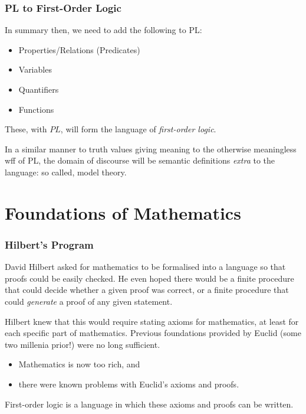 \documentclass{beamer}
\begin{document}
\begin{frame}
	\frametitle{PL to First-Order Logic}
	
	In summary then, we need to add the following to PL: 
	
	\begin{itemize}
		\item Properties/Relations (Predicates)
		\item Variables
		\item Quantifiers
		\item Functions
	\end{itemize}
	
	These, with $PL$, will form the language of \emph{first-order logic}. 
	
	\vspace{0.5cm} 
	
	In a similar manner to truth values giving meaning to the otherwise meaningless wff of PL, the domain of discourse will be semantic definitions \emph{extra} to the language: so called, model theory. 
	
\end{frame}

\section{Foundations of Mathematics}

\begin{frame}
	\frametitle{Hilbert's Program}
	
	David Hilbert asked for mathematics to be formalised into a language so that proofs could be easily checked. He even hoped there would be a finite procedure that could decide whether a given proof was correct, or a finite procedure that could \textit{generate} a proof of any given statement. 
	
	\vspace{0.5cm}
	
	Hilbert knew that this would require stating axioms for mathematics, at least for each specific part of mathematics. Previous foundations provided by Euclid (some two millenia prior!) were no long sufficient.
	
	\vspace{0.3cm}
	
	\begin{itemize}
		\item Mathematics is now too rich, and 
		\item there were known problems with Euclid's axioms and proofs. 
	\end{itemize}

	\vspace{0.3cm}
	
	First-order logic is a language in which these axioms and proofs can be written. 
	
\end{frame}
\end{document}
